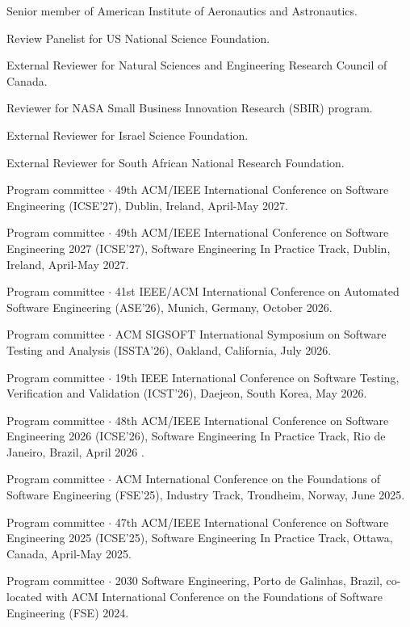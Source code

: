 \documentclass[ComputerScience]{vita}
\begin{document}
\begin{vita}
\begin{Professional Activities and Service}
\item Senior member of American Institute of Aeronautics and Astronautics.
\item Review Panelist for US National Science Foundation. 
\item External Reviewer for Natural Sciences and Engineering Research Council of Canada.
\item Reviewer for NASA Small Business Innovation Research (SBIR) program.
\item External Reviewer for Israel Science Foundation.
\item External Reviewer for South African National Research Foundation.
\end{Professional Activities and Service}

\begin{Panel and Committee Service}
\item Program committee $\cdot$ 49th ACM/IEEE International Conference
  on Software Engineering (ICSE'27), Dublin, Ireland, April-May 2027.
    \item Program committee $\cdot$ 49th ACM/IEEE International Conference on 
    Software Engineering 2027 (ICSE'27), Software Engineering In Practice Track, Dublin, Ireland, April-May 2027.
\item Program committee $\cdot$ 41st IEEE/ACM International Conference 
  on Automated Software Engineering (ASE'26), Munich, Germany, 
  October 2026.  
\item Program committee $\cdot$ ACM SIGSOFT International Symposium on Software Testing and Analysis (ISSTA'26), Oakland, California, July 2026.
  \item Program committee $\cdot$ 19th IEEE International Conference on Software Testing, Verification and Validation (ICST'26),
    Daejeon, South Korea, May 2026.
  \item Program committee $\cdot$ 48th ACM/IEEE International Conference on 
    Software Engineering 2026 (ICSE'26), Software Engineering In Practice Track, Rio de Janeiro, Brazil, April 2026  .
  \item Program committee $\cdot$ ACM International Conference on the Foundations of Software Engineering (FSE'25), Industry Track, Trondheim, Norway, June 2025.
  \item Program committee $\cdot$ 47th ACM/IEEE International Conference on 
    Software Engineering 2025 (ICSE'25), Software Engineering In Practice Track, Ottawa, Canada, April-May 2025.
  \item Program committee $\cdot$ 2030 Software Engineering, Porto de Galinhas, Brazil, co-located with ACM International Conference on the Foundations of Software Engineering (FSE) 2024.

\end{Panel and Committee Service}
\end{vita}
\end{document}
